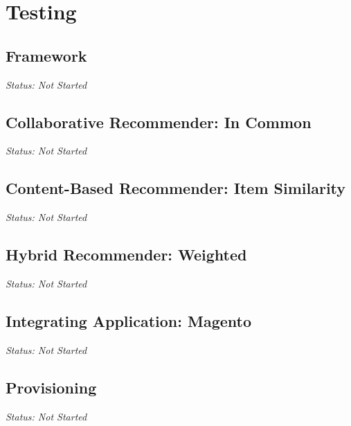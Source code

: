 \chapter{Testing}

\section{Framework}

\emph{Status: Not Started}

\section{Collaborative Recommender: In Common}

\emph{Status: Not Started}

\section{Content-Based Recommender: Item Similarity}

\emph{Status: Not Started}

\section{Hybrid Recommender: Weighted}

\emph{Status: Not Started}

\section{Integrating Application: Magento}

\emph{Status: Not Started}

\section{Provisioning}

\emph{Status: Not Started}